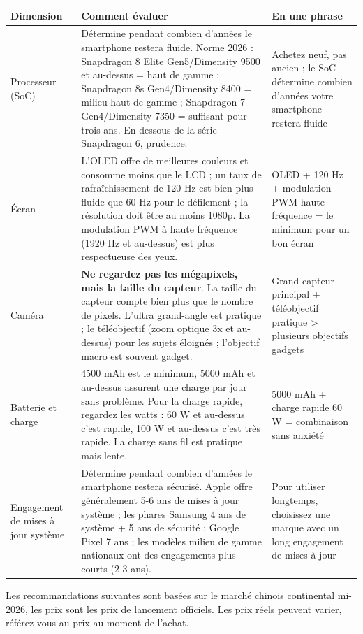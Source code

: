 \begin{center}
\begin{tabularx}{\linewidth}{|X|X|X|}
\hline
\textbf{Dimension} & \textbf{Comment évaluer} & \textbf{En une phrase} \tabularnewline
\hline
Processeur (SoC) & Détermine pendant combien d'années le smartphone restera fluide. Norme 2026 : Snapdragon 8 Elite Gen5/Dimensity 9500 et au-dessus = haut de gamme ; Snapdragon 8s Gen4/Dimensity 8400 = milieu-haut de gamme ; Snapdragon 7+ Gen4/Dimensity 7350 = suffisant pour trois ans. En dessous de la série Snapdragon 6, prudence. & Achetez neuf, pas ancien ; le SoC détermine combien d'années votre smartphone restera fluide \tabularnewline
Écran & L'OLED offre de meilleures couleurs et consomme moins que le LCD ; un taux de rafraîchissement de 120 Hz est bien plus fluide que 60 Hz pour le défilement ; la résolution doit être au moins 1080p. La modulation PWM à haute fréquence (1920 Hz et au-dessus) est plus respectueuse des yeux. & OLED + 120 Hz + modulation PWM haute fréquence = le minimum pour un bon écran \tabularnewline
Caméra & \textbf{Ne regardez pas les mégapixels, mais la taille du capteur}. La taille du capteur compte bien plus que le nombre de pixels. L'ultra grand-angle est pratique ; le téléobjectif (zoom optique 3x et au-dessus) pour les sujets éloignés ; l'objectif macro est souvent gadget. & Grand capteur principal + téléobjectif pratique > plusieurs objectifs gadgets \tabularnewline
Batterie et charge & 4500 mAh est le minimum, 5000 mAh et au-dessus assurent une charge par jour sans problème. Pour la charge rapide, regardez les watts : 60 W et au-dessus c'est rapide, 100 W et au-dessus c'est très rapide. La charge sans fil est pratique mais lente. & 5000 mAh + charge rapide 60 W = combinaison sans anxiété \tabularnewline
Engagement de mises à jour système & Détermine pendant combien d'années le smartphone restera sécurisé. Apple offre généralement 5-6 ans de mises à jour système ; les phares Samsung 4 ans de système + 5 ans de sécurité ; Google Pixel 7 ans ; les modèles milieu de gamme nationaux ont des engagements plus courts (2-3 ans). & Pour utiliser longtemps, choisissez une marque avec un long engagement de mises à jour \tabularnewline
\hline
\end{tabularx}
\end{center}


Les recommandations suivantes sont basées sur le marché chinois continental mi-2026, les prix sont les prix de lancement officiels. Les prix réels peuvent varier, référez-vous au prix au moment de l'achat.


